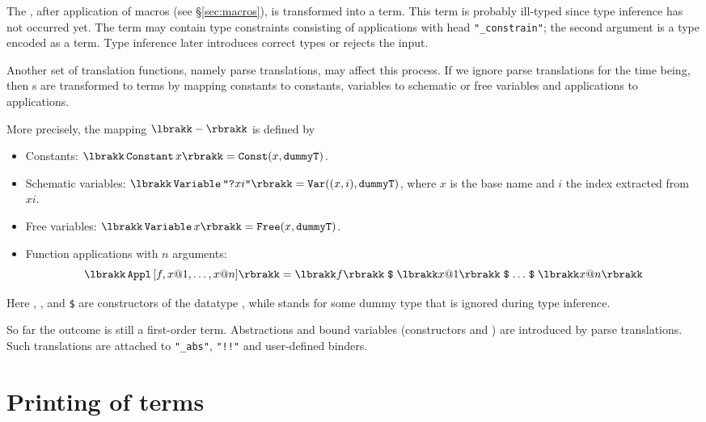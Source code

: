 The \AST{}, after application of macros (see \S\ref{sec:macros}), is
transformed into a term.  This term is probably ill-typed since type
inference has not occurred yet.  The term may contain type constraints
consisting of applications with head {\tt "_constrain"}; the second
argument is a type encoded as a term.  Type inference later introduces
correct types or rejects the input.

Another set of translation functions, namely parse
translations, may affect this process.  If we
ignore parse translations for the time being, then \AST{}s are transformed
to terms by mapping \AST{} constants to constants, \AST{} variables to
schematic or free variables and \AST{} applications to applications.

More precisely, the mapping $\termofast{-}$ is defined by
\begin{itemize}
\item Constants: $\termofast{\Constant x} = \ttfct{Const} (x,
  \mtt{dummyT})$.

\item Schematic variables: $\termofast{\Variable \mtt{"?}xi\mtt"} =
  \ttfct{Var} ((x, i), \mtt{dummyT})$, where $x$ is the base name and $i$
  the index extracted from~$xi$.

\item Free variables: $\termofast{\Variable x} = \ttfct{Free} (x,
  \mtt{dummyT})$.

\item Function applications with $n$ arguments:
    \[ \termofast{\Appl{f, x@1, \ldots, x@n}} = 
       \termofast{f} \ttapp
         \termofast{x@1} \ttapp \ldots \ttapp \termofast{x@n}
    \]
\end{itemize}
Here , ,  and
\verb|$| are constructors of the datatype ,
while  stands for some dummy type that is ignored during
type inference.

So far the outcome is still a first-order term.  Abstractions and bound
variables (constructors  and ) are introduced
by parse translations.  Such translations are attached to {\tt "_abs"},
{\tt "!!"} and user-defined binders.


\section{Printing of terms}
\newcommand\astofterm[1]{\lbrakk#1\rbrakk}

